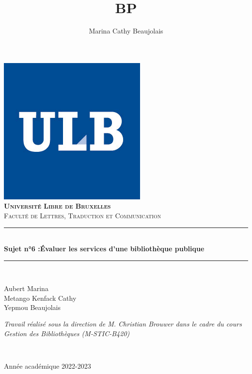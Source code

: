 \documentclass[french,a4paper,12pt]{article}
\title{BP} %
\author{Marina Cathy Beaujolais}
\newcommand{\HRule}{\rule{\linewidth}{0.5mm}}
\begin{document}
\begin{titlepage}
  \begin{sffamily}
  \begin{center}
    
    \includegraphics[scale=0.25]{logoulb.JPG}~\\[1.5cm]

    \textsc{\bfseries \LARGE Université Libre de Bruxelles }\\[0.5cm]
    \textsc{\Large Faculté de Lettres, Traduction et Communication}\\[6cm]

    \HRule \\[0.4cm]
    { \huge \bfseries Sujet n°6 :​Évaluer les services​ d’une bibliothèque publique\\[0.4cm] }

    \HRule \\[4cm]
    \begin{minipage}{0.4\textwidth}
      \begin{flushleft} \large
        Aubert Marina \\
        Metango Kenfack Cathy \\
        Yepmou Beaujolais \\
        
      \end{flushleft}
    \end{minipage}
    \begin{minipage}{0.4\textwidth}
      \begin{flushright} \large
        \emph{Travail réalisé sous la direction de M. Christian Brouwer dans le cadre du cours Gestion des Bibliothèques (M-STIC-B420)} 
      \end{flushright}
    \end{minipage} \\ [2cm]

    \vfill

    {\large {} Année académique 2022-2023}

  \end{center}
  \end{sffamily}
\end{titlepage}
\end{document}
